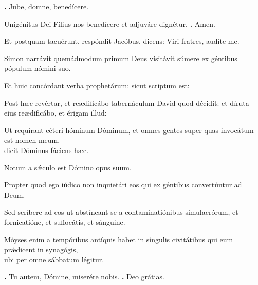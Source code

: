 \begin{small}
\textbf{\Vbar.} Jube, domne, benedícere.

Unigénitus Dei Fílius nos benedícere et adjuváre dignétur. 
\textbf{\Rbar.} Amen.
\end{small}


Et postquam tacuérunt, respóndit Jacóbus, dicens: Viri fratres, audíte me.

Simon narrávit quemádmodum primum Deus visitávit súmere ex géntibus pópulum nómini suo.

Et huic concórdant verba prophetárum: sicut scriptum est:

Post hæc revértar, et reædificábo tabernáculum David quod décidit: et díruta eius reædificábo, et érigam illud:

Ut requírant céteri hóminum Dóminum, et omnes gentes super quas invocátum est nomen meum, \\
dicit Dóminus fáciens hæc.

Notum a sǽculo est Dómino opus suum.

Propter quod ego iúdico non inquietári eos qui ex géntibus convertúntur ad Deum,

Sed scríbere ad eos ut abstíneant se a contaminatiónibus simulacrórum, et fornicatióne, et suffocátis, et sánguine.

Móyses enim a tempóribus antíquis habet in síngulis civitátibus qui eum prǽdicent in synagógis, \\
ubi per omne sábbatum légitur.

\textbf{\Vbar.} Tu autem, Dómine, miserére nobis.
\textbf{\Rbar.} Deo grátias.

